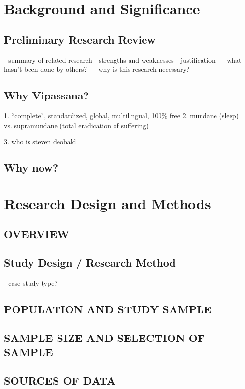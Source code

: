 \documentclass[a4paper, amsfonts, amssymb, amsmath, reprint, showkeys, nofootinbib, twoside]{revtex4-1}
\begin{document}
\section{Background and Significance}

\subsection{Preliminary Research Review}
- summary of related research
- strengths and weaknesses
- justification
--- what hasn't been done by others?
--- why is this research necessary?

\subsection{Why Vipassana?}

1. ``complete'', standardized, global, multilingual, 100\% free
2. mundane (sleep) vs. supramundane (total eradication of suffering)



3. who is steven deobald

\subsection{Why now?}

\section{Research Design and Methods}
\subsection{OVERVIEW}

\subsection{Study Design / Research Method}
- case study type?

\subsection{POPULATION AND STUDY SAMPLE}
\subsection{SAMPLE SIZE AND SELECTION OF SAMPLE}
\subsection{SOURCES OF DATA}
\end{document}
